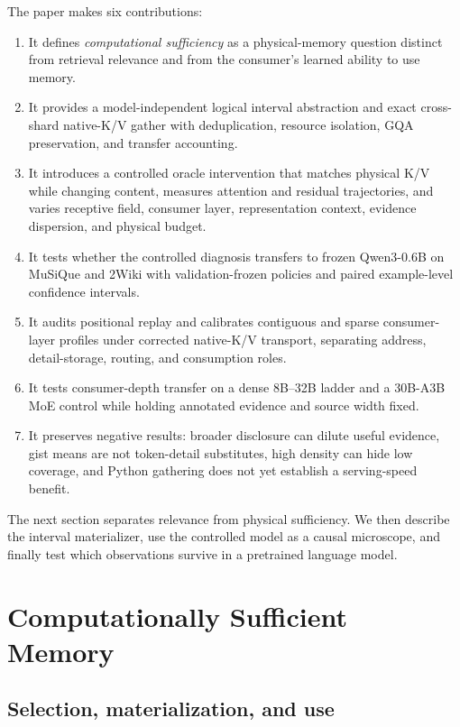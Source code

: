 \documentclass[11pt]{article}
\begin{document}
The paper makes six contributions:
\begin{enumerate}
\item It defines \emph{computational sufficiency} as a physical-memory question distinct from
retrieval relevance and from the consumer's learned ability to use memory.
\item It provides a model-independent logical interval abstraction and exact cross-shard native-K/V
gather with deduplication, resource isolation, GQA preservation, and transfer accounting.
\item It introduces a controlled oracle intervention that matches physical K/V while changing
content, measures attention and residual trajectories, and varies receptive field, consumer layer,
representation context, evidence dispersion, and physical budget.
\item It tests whether the controlled diagnosis transfers to frozen Qwen3-0.6B on MuSiQue and
2Wiki with validation-frozen policies and paired example-level confidence intervals.
\item It audits positional replay and calibrates contiguous and sparse consumer-layer profiles
under corrected native-K/V transport, separating address, detail-storage, routing, and consumption
roles.
\item It tests consumer-depth transfer on a dense 8B--32B ladder and a 30B-A3B MoE control while
holding annotated evidence and source width fixed.
\item It preserves negative results: broader disclosure can dilute useful evidence, gist means are
not token-detail substitutes, high density can hide low coverage, and Python gathering does not
yet establish a serving-speed benefit.
\end{enumerate}

The next section separates relevance from physical sufficiency.  We then describe the interval
materializer, use the controlled model as a causal microscope, and finally test which observations
survive in a pretrained language model.

\section{Computationally Sufficient Memory}

\subsection{Selection, materialization, and use}
\end{document}
